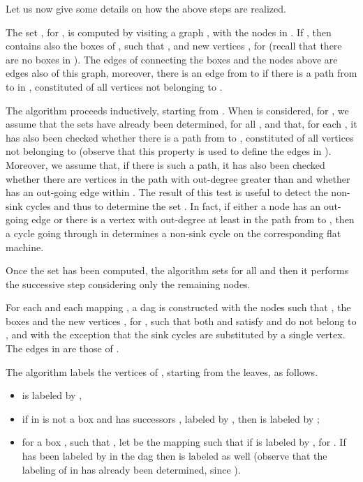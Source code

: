 \documentclass[letterpaper,twocolumn,10pt]{article}
\newcommand{\ignore}[1]{}
\begin{document}
Let us now give some details on how the above steps are realized.


The set , for ,
is computed by visiting a graph
, with the nodes in .
If , then  contains also
 the boxes  of , such that , and
new vertices , for  (recall that there are no boxes in ). The
edges of  connecting the boxes and the nodes above are edges also of this graph,
moreover, there is an edge from  to  if there is a path from  to  in ,
constituted of all vertices not belonging to .

The algorithm  proceeds inductively,
starting from . When   is considered, for ,  we assume that
the sets   have already been determined, for all , and that, for each ,
 it has also been checked
whether there is a path from  to  , constituted of all vertices not belonging to 
(observe that  this property is used to define the edges in  ).
Moreover, we assume that, if there is such a path, it has also  been  checked whether  there are  vertices in the path with out-degree
greater than  and
whether  has an out-going edge within  .
The result of this test  is useful to detect the non-sink cycles and thus to
determine the  set .
In fact,   if  either a node 
 has an out-going edge or there is a vertex with out-degree
at least  in the path from  to , then
a cycle going through   in  determines  a non-sink cycle on the corresponding flat machine.



Once the set   has been computed, the algorithm sets  for all
 and then it performs the successive step considering only the remaining nodes.

For each  and each
mapping  , a dag  is constructed with the
nodes  such that  , the boxes  and the new vertices  , for ,
 such that  both
 and  satisfy  and do not belong to , and with
the exception that the sink cycles are substituted
by a single vertex. The edges in    are those of  .



\ignore{
If , we inductively assume that for   and
for all the nodes   of ,
for a mapping ,
 if  satisfies  and

for a mapping ,,
the maximum value  in 
such that  satisfies  has been determined.}

 The algorithm
labels the vertices of ,  starting from  the leaves,   as follows.


\begin{itemize}
\item
  is labeled by ,
\item
if  in  is not a box  and
 has successors , labeled by , then  is labeled by
 ;
\item
for a box , such that , let  be the mapping  such that   if 
is labeled by , for .
If   has been labeled by  in the dag    then  is labeled  as well
(observe that  the labeling of  in    has already been determined,  since ).
\end{itemize}
\end{document}
